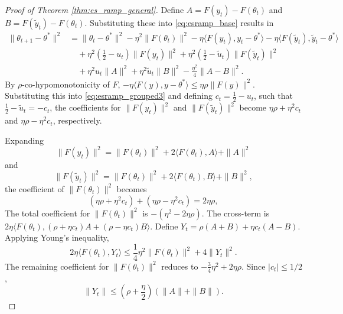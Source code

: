 \documentclass[letter,11pt]{article}
\begin{document}
\begin{proof}[Proof of Theorem \ref{thm:es_ramp_general}]
Define $A = F(y_t) - F(\theta_t)$ and $B = F(\tilde{y}_t) - F(\theta_t)$. Substituting these into \eqref{eq:esramp_base} results in
\begin{equation} \label{eq:esramp_grouped3}
\begin{aligned}
\|\theta_{t+1} - \theta^*\|^2 &= \|\theta_t - \theta^*\|^2 - \eta^2 \|F(\theta_t)\|^2 - \eta \langle F(y_t), y_t - \theta^* \rangle - \eta \langle F(\tilde{y}_t), \tilde{y}_t - \theta^* \rangle \\
&\quad + \eta^2 \left(\frac{1}{2} - u_t\right)\|F(y_t)\|^2 + \eta^2 \left(\frac{1}{2} - \tilde{u}_t\right)\|F(\tilde{y}_t)\|^2 \\
&\quad + \eta^2 u_t \|A\|^2 + \eta^2 \tilde{u}_t \|B\|^2 - \frac{\eta^2}{4} \|A - B\|^2.
\end{aligned}
\end{equation}
By $\rho$-co-hypomonotonicity of $F$, $-\eta \langle F(y), y - \theta^* \rangle \le \eta\rho \|F(y)\|^2$. Substituting this into \eqref{eq:esramp_grouped3} and defining $c_t = \frac{1}{2} - u_t$, such that $\frac{1}{2} - \tilde{u}_t = -c_t$, the coefficients for $\|F(y_t)\|^2$ and $\|F(\tilde{y}_t)\|^2$ become $\eta\rho + \eta^2 c_t$ and $\eta\rho - \eta^2 c_t$, respectively.

Expanding 
\begin{equation}
 \|F(y_t)\|^2 = \|F(\theta_t)\|^2 + 2\langle F(\theta_t), A \rangle + \|A\|^2
\end{equation}
and
\begin{equation}
 \|F(\tilde{y}_t)\|^2 = \|F(\theta_t)\|^2 + 2\langle F(\theta_t), B \rangle + \|B\|^2,
\end{equation}
the coefficient of $\|F(\theta_t)\|^2$ becomes 
\begin{equation}
 (\eta\rho + \eta^2 c_t) + (\eta\rho - \eta^2 c_t) = 2\eta\rho,
\end{equation}
The total coefficient for $\|F(\theta_t)\|^2$ is $-( \eta^2 - 2\eta\rho )$.
The cross-term is $2\eta \langle F(\theta_t), (\rho + \eta c_t)A + (\rho - \eta c_t)B \rangle$. Define $Y_t = \rho(A+B) + \eta c_t (A-B)$. Applying Young's inequality,
\begin{equation}
 2\eta \langle F(\theta_t), Y_t \rangle \le \frac{1}{4} \eta^2 \|F(\theta_t)\|^2 + 4 \|Y_t\|^2. 
\end{equation}
The remaining coefficient for $\|F(\theta_t)\|^2$ reduces to $-\frac{3}{4}\eta^2 + 2\eta\rho$. Since $|c_t| \le 1/2$, 
\begin{equation}
 \|Y_t\| \le (\rho + \frac{\eta}{2})(\|A\| + \|B\|).
\end{equation}


\end{proof}
\end{document}
